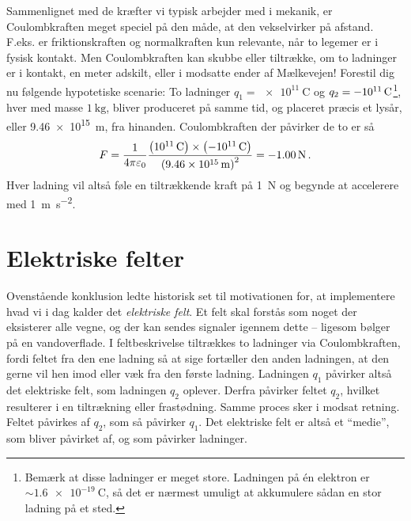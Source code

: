 Sammenlignet med de kræfter vi typisk arbejder med i mekanik, er Coulombkraften meget speciel på den måde, at den vekselvirker på afstand. F.eks. er friktionskraften og normalkraften kun relevante, når to legemer er i fysisk kontakt. Men Coulombkraften kan skubbe eller tiltrække, om to ladninger er i kontakt, en meter adskilt, eller i modsatte ender af Mælkevejen!
Forestil dig nu følgende hypotetiske scenarie: To ladninger $q_1=\SI{e11}{\coulomb}$ og $q_2=\SI{-e11}{\coulomb}$\footnote{Bemærk at disse ladninger er meget store. Ladningen på én elektron er $\sim\SI{1.6e-19}{\coulomb}$, så det er nærmest umuligt at akkumulere sådan en stor ladning på et sted.}, hver med masse $\SI{1}{\kilogram}$, bliver produceret på samme tid, og placeret præcis et lysår, eller \SI{9.46e15}{\meter}, fra hinanden. Coulombkraften der påvirker de to er så
\begin{equation}
    F=\frac{1}{4\pi\varepsilon_0}\frac{\left(\SI{e11}{\coulomb}\right)\times\left(\SI{-e11}{\coulomb}\right)}{\left(\SI{9.46e15}{\meter}\right)^2}=\SI{-1.00}{\newton} \, .
\end{equation}
Hver ladning vil altså føle en tiltrækkende kraft på \SI{1}{\newton} og begynde at accelerere med \SI{1}{\meter\per\second\squared}.

\section{Elektriske felter}
Ovenstående konklusion ledte historisk set til motivationen for, at implementere hvad vi i dag kalder det \emph{elektriske felt}. Et felt skal forstås som noget der eksisterer alle vegne, og der kan sendes signaler igennem dette -- ligesom bølger på en vandoverflade. I feltbeskrivelse tiltrækkes to ladninger via Coulombkraften, fordi feltet fra den ene ladning så at sige fortæller den anden ladningen, at den gerne vil hen imod eller væk fra den første ladning. Ladningen $q_1$ påvirker altså det elektriske felt, som ladningen $q_2$ oplever. Derfra påvirker feltet $q_2$, hvilket resulterer i en tiltrækning eller frastødning. Samme proces sker i modsat retning. Feltet påvirkes af $q_2$, som så påvirker $q_1$. Det elektriske felt er altså et ``medie'', som bliver påvirket af, og som påvirker ladninger.

